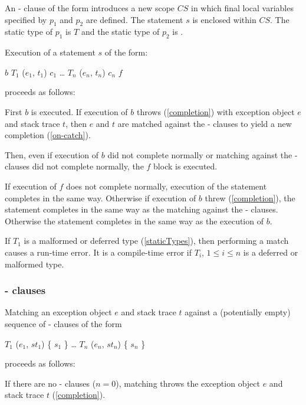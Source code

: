 \documentclass[makeidx]{article}
\begin{document}
{\LMHash{}%
An \ON{}-\CATCH{} clause of the form  introduces a new scope $CS$ in which final local variables specified by $p_1$ and $p_2$ are defined.
The statement $s$ is enclosed within $CS$.
The static type of $p_1$ is $T$ and the static type of $p_2$ is .

\LMHash{}%
Execution of a \TRY{} statement $s$ of the form:

\begin{dartCode}
\TRY{} $b$
\ON{} $T_1$ \CATCH{} ($e_1$, $t_1$) $c_1$
\ldots{}
\ON{} $T_n$ \CATCH{} ($e_n$, $t_n$) $c_n$
\FINALLY{} $f$
\end{dartCode}
proceeds as follows:

\LMHash{}%
First $b$ is executed.
If execution of $b$ throws (\ref{completion}) with exception object $e$ and stack trace $t$, then $e$ and $t$ are matched against the \ON{}-\CATCH{} clauses to yield a new completion (\ref{on-catch}).

Then, even if execution of $b$ did not complete normally or matching against the \ON{}-\CATCH{} clauses did not complete normally, the $f$ block is executed.

If execution of $f$ does not complete normally,
execution of the \TRY{} statement completes in the same way.
Otherwise if execution of $b$ threw (\ref{completion}), the \TRY{} statement completes in the same way as the matching against the \ON{}-\CATCH{} clauses.
Otherwise the \TRY{} statement completes in the same way as the execution of $b$.

\LMHash{}%
If $T_1$ is a malformed or deferred type (\ref{staticTypes}), then performing a match causes a run-time error.
It is a compile-time error if $T_i$, $1 \le i \le n$ is a deferred or malformed type.


\subsubsection{\ON{}-\CATCH{} clauses}

\LMHash{}%
Matching an exception object $e$ and stack trace $t$ against a (potentially empty) sequence of \ON{}-\CATCH{} clauses of the form

\begin{dartCode}
\ON{} $T_1$ \CATCH{} ($e_1$, $st_1$) \{ $s_1$ \}
\ldots
\ON{} $T_n$ \CATCH{} ($e_n$, $st_n$) \{ $s_n$ \}
\end{dartCode}
proceeds as follows:

\LMHash{}%
If there are no \ON{}-\CATCH{} clauses ($n = 0$), matching throws the exception object $e$ and stack trace $t$ (\ref{completion}).

}
\end{document}
